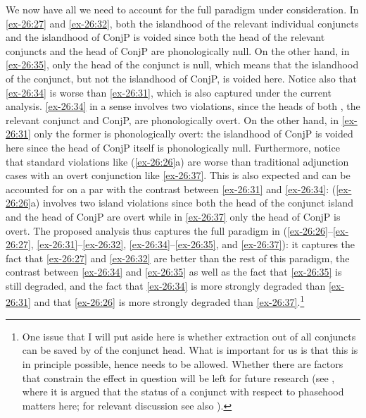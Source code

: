 \documentclass[output=paper]{langsci/langscibook}
\begin{document}
We now have all we need to account for the full paradigm under consideration.
In \eqref{ex-26:27} and \eqref{ex-26:32}, both the islandhood of the relevant individual conjuncts and
the islandhood of ConjP is voided since both the head of the relevant conjuncts
and the head of ConjP are phonologically null. On the other hand, in \eqref{ex-26:35}, only
the head of the conjunct is null, which means that the islandhood of the
conjunct, but not the islandhood of ConjP, is voided here. Notice also that
\eqref{ex-26:34} is worse than \eqref{ex-26:31}, which is also captured under the current analysis.
\eqref{ex-26:34} in a sense involves two violations, since the heads of both , the
relevant conjunct and ConjP, are phonologically overt. On the other hand, in
\eqref{ex-26:31} only the former is phonologically overt: the islandhood of ConjP is voided
here since the head of ConjP itself is phonologically null. Furthermore, notice
that standard  violations like (\ref{ex-26:26}a) are worse than traditional
adjunction cases with an overt conjunction like \eqref{ex-26:37}. This is also expected and
can be accounted for on a par with the contrast between \eqref{ex-26:31} and \eqref{ex-26:34}: (\ref{ex-26:26}a)
involves two island violations since both the head of the conjunct island and
the head of ConjP are overt while in \eqref{ex-26:37} only the head of ConjP is overt. The
proposed analysis thus captures the full paradigm in (\ref{ex-26:26}--\ref{ex-26:27}, \ref{ex-26:31}--\ref{ex-26:32},
\ref{ex-26:34}--\ref{ex-26:35}, and \ref{ex-26:37}): it captures the fact that \eqref{ex-26:27} and \eqref{ex-26:32} are better than
the rest of this paradigm, the contrast between \eqref{ex-26:34} and \eqref{ex-26:35} as well as the
fact that \eqref{ex-26:35} is still degraded, and the fact that \eqref{ex-26:34} is more strongly
degraded than \eqref{ex-26:31} and that \eqref{ex-26:26} is more strongly degraded than
\eqref{ex-26:37}.\footnote{One issue that I will put aside here is whether extraction out
    of all conjuncts can be saved by  of the conjunct head. What is
    important for us is that this is in principle possible, hence needs to be
    allowed. Whether there are factors that constrain the effect in question
will be left for future research (see \citealt{Boskovic2017}, where it is
argued that the status of a conjunct with respect to phasehood matters here;
for relevant discussion see also \citealt{Boskovicinprep}).}
\end{document}
